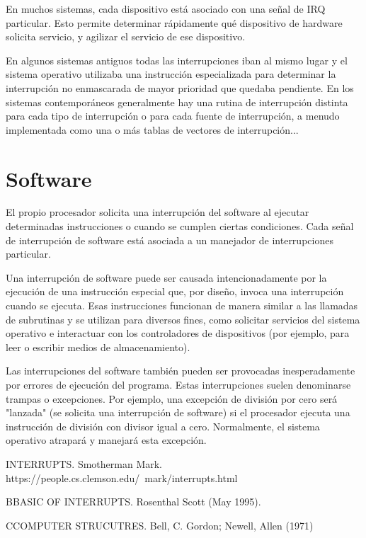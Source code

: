 \documentclass{article}
\begin{document}
En muchos sistemas, cada dispositivo está asociado con una señal de IRQ particular. Esto permite determinar rápidamente qué dispositivo de hardware solicita servicio, y agilizar el servicio de ese dispositivo.

En algunos sistemas antiguos todas las interrupciones iban al mismo lugar y el sistema operativo utilizaba una instrucción especializada para determinar la interrupción no enmascarada de mayor prioridad que quedaba pendiente. En los sistemas contemporáneos generalmente hay una rutina de interrupción distinta para cada tipo de interrupción o para cada fuente de interrupción, a menudo implementada como una o más tablas de vectores de interrupción...

\section{Software}

El propio procesador solicita una interrupción del software al ejecutar determinadas instrucciones o cuando se cumplen ciertas condiciones. Cada señal de interrupción de software está asociada a un manejador de interrupciones particular.

Una interrupción de software puede ser causada intencionadamente por la ejecución de una instrucción especial que, por diseño, invoca una interrupción cuando se ejecuta. Esas instrucciones funcionan de manera similar a las llamadas de subrutinas y se utilizan para diversos fines, como solicitar servicios del sistema operativo e interactuar con los controladores de dispositivos (por ejemplo, para leer o escribir medios de almacenamiento).

Las interrupciones del software también pueden ser provocadas inesperadamente por errores de ejecución del programa. Estas interrupciones suelen denominarse trampas o excepciones. Por ejemplo, una excepción de división por cero será "lanzada" (se solicita una interrupción de software) si el procesador ejecuta una instrucción de división con divisor igual a cero. Normalmente, el sistema operativo atrapará y manejará esta excepción.



\vspace{2mm}



\vspace{2mm}


\vspace{2mm}


\vspace{2mm} 

\newpage

\begin{thebibliography}{X}

INTERRUPTS. Smotherman Mark. https://people.cs.clemson.edu/~mark/interrupts.html

\bibitem BBASIC OF INTERRUPTS. Rosenthal Scott (May 1995).

\bibitem CCOMPUTER STRUCUTRES.  Bell, C. Gordon; Newell, Allen (1971)



\end{thebibliography}
\end{document}
